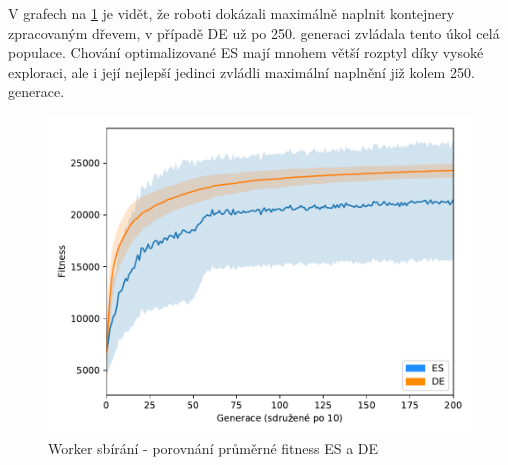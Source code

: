 	V grafech na \ref{obr04:PickupESvsDE} je vidět, že roboti dokázali maximálně naplnit kontejnery zpracovaným dřevem, v případě DE už po 250. generaci zvládala tento úkol celá populace. Chování optimalizované ES mají mnohem větší rozptyl díky vysoké exploraci, ale i její nejlepší jedinci zvládli maximální naplnění již kolem 250. generace. 
		   \begin{figure}[t]\centering       
		\includegraphics[width=\columnwidth]{../img/WoodMap/DEvsES/WorkerPickUpMem}
		\caption{ Worker sbírání - porovnání průměrné fitness ES a DE}
		\label{obr04:PickupESvsDE}
	\end{figure}
	\clearpage
